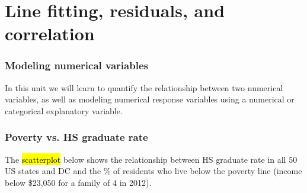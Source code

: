 
\section{Line fitting, residuals, and correlation}


\begin{frame}
\frametitle{Modeling numerical variables}

In this unit we will learn to quantify the relationship between two numerical variables, as well as modeling numerical response variables using a numerical or categorical explanatory variable.

\end{frame}


\begin{frame}
\frametitle{Poverty vs. HS graduate rate}

The \hl{scatterplot} below shows the relationship between HS graduate rate in all 50 US states and DC and the \% of residents who live below the poverty line {\small (income below \$23,050 for a family of 4 in 2012)}.

{
\pause
{}
\pause
{}
\pause
{}
\pause
{}
\pause
{}
}

\end{frame}

